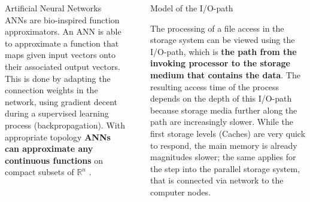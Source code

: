\documentclass[final]{beamer}
\newlength{\sepwid}
\newlength{\onecolwid}
\begin{document}
\begin{frame}[t]
\begin{columns}[t]
\begin{column}{\onecolwid}
\begin{block}{Artificial Neural Networks}
	ANNs are bio-inspired function approximators.
	An ANN is able to approximate a function that maps given input vectors onto their associated output vectors.
	This is done by adapting the connection weights in the network, using gradient decent during a supervised learning process (backpropagation).
	With appropriate topology \textbf{ANNs can approximate any continuous functions} on compact subsets of $\mathbb{R}^n$ \cite{cybenko:mcss}.
	
	
\end{block}

\end{column} %

\begin{column}{\sepwid}\end{column} %

\begin{column}{\onecolwid} %
	

\begin{block}{Model of the I/O-path}
	
	The processing of a file access in the storage system can be viewed using the I/O-path, which is \textbf{the path from the invoking processor to the storage medium that contains the data}.
	The resulting access time of the process depends on the depth of this I/O-path because storage media further along the path are increasingly slower.
	While the first storage levels (Caches) are very quick to respond, the main memory is already magnitudes slower; the same applies for the step into the parallel storage system, that is connected via network to the computer nodes. %
		
	



\end{block}
\end{column}
\end{columns}
\end{frame}
\end{document}
